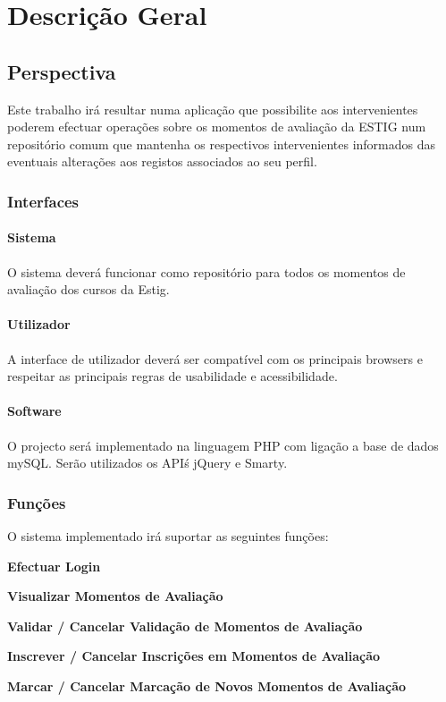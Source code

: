 

\chapter{Descrição Geral}

\paragraph{}

\section{Perspectiva}
Este trabalho irá resultar numa aplicação que possibilite aos intervenientes poderem efectuar operações sobre os momentos de avaliação da ESTIG num repositório comum que mantenha os respectivos intervenientes informados das eventuais alterações aos registos associados ao seu perfil.\\

\subsection{Interfaces}
\subsubsection{Sistema}
O sistema deverá funcionar como repositório para todos os momentos de avaliação dos cursos da Estig.

\subsubsection{Utilizador}
A interface de utilizador deverá ser compatível com os principais browsers e respeitar as principais regras de usabilidade e acessibilidade.

\subsubsection{Software}
O projecto será implementado na linguagem PHP com ligação a base de dados mySQL. Serão utilizados os API\'s jQuery e Smarty.

\subsection{Funções}
O sistema implementado irá suportar as seguintes funções:

\begin{list}{-}{}
\item \textbf{Efectuar Login}
\item \textbf{Visualizar Momentos de Avaliação}
\item \textbf{Validar / Cancelar Validação de Momentos de Avaliação}
\item \textbf{Inscrever / Cancelar Inscrições em Momentos de Avaliação}
\item \textbf{Marcar / Cancelar Marcação de Novos Momentos de Avaliação}
\end{list}

